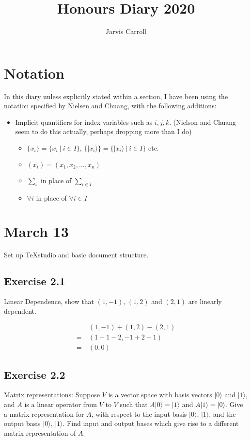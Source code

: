 \documentclass[]{article}
\title{Honours Diary 2020}
\author{Jarvis Carroll}
\begin{document}
\maketitle

\section{Notation}

In this diary unless explicitly stated within a section, I have been using the notation specified by Nielsen and Chuang, with the following additions:
\begin{itemize}
	\item Implicit quantifiers for index variables such as $i, j, k$. (Nielson and Chuang seem to do this actually, perhaps dropping more than I do)
	\begin{itemize}
		\item $\{x_i\} = \{x_i\ |\ i \in I\}$, $\{|x_i\rangle\} = \{|x_i\rangle\ |\ i \in I\}$ etc.
		\item $(x_i) = (x_1, x_2, \ldots, x_n)$
		\item $\sum_i$ in place of $\sum_{i \in I}$
		\item $\forall i$ in place of $\forall i \in I$
	\end{itemize}
\end{itemize}

\section{March 13}

Set up TeXstudio and basic document structure.

\subsection{Exercise 2.1}
Linear Dependence, show that $(1,-1)$, $(1,2)$ and $(2,1)$ are linearly dependent.

\begin{align*}
	&(1, -1) + (1, 2) - (2, 1) \\
=\ &(1+1-2, -1+2-1) \\
=\ &(0, 0)
\end{align*}

\subsection{Exercise 2.2}
Matrix representations: Suppose $V$ is a vector space with basis vectors $|0\rangle$ and $|1\rangle$, and $A$ is a linear operator from $V$ to $V$ such that $A|0\rangle=|1\rangle$ and $A|1\rangle=|0\rangle$. Give a matrix representation for $A$, with respect to the input basis $|0\rangle$, $|1\rangle$, and the output basis $|0\rangle$, $|1\rangle$. Find input and output bases which give rise to a different matrix representation of $A$.
\end{document}
